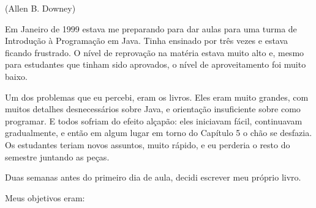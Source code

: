 (Allen B. Downey)


Em Janeiro de 1999 estava me preparando para dar aulas para uma turma de 
Introdução à Programação em Java. Tinha ensinado por três vezes e estava 
ficando frustrado. O nível de reprovação na matéria estava muito alto e, 
mesmo para estudantes que tinham sido aprovados, o nível de aproveitamento foi 
muito baixo.


Um dos problemas que eu percebi, eram os livros. Eles eram muito grandes, com 
muitos detalhes desnecessários sobre Java, e orientação insuficiente sobre 
como programar. E todos sofriam do efeito alçapão: eles iniciavam fácil, 
continuavam gradualmente, e então em algum lugar em torno do Capítulo 5 o 
chão se desfazia. Os estudantes teriam novos assuntos, muito rápido, e eu 
perderia o resto do semestre juntando as peças.

Duas semanas antes do primeiro dia de aula, decidi escrever meu próprio livro.

Meus objetivos eram:


